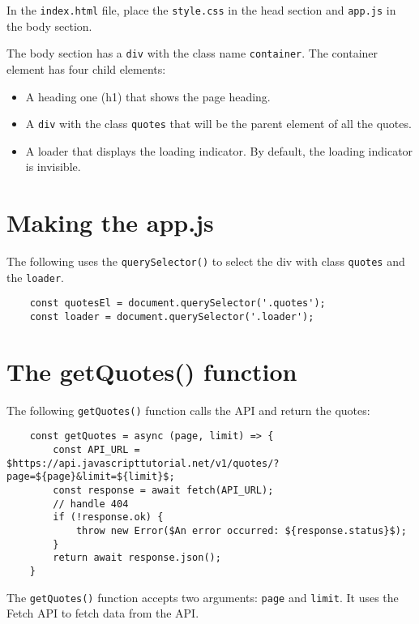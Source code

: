 \documentclass[11pt]{article}
\begin{document}
\noindent
In the \verb|index.html| file, place the \verb|style.css| in the head section
and \verb|app.js| in the body section.
\newline

\noindent
The body section has a \verb|div| with the class name \verb|container|.
The container element has four child elements:

\begin{itemize}
\item A heading one (h1) that shows the page heading.
\item A \verb|div| with the class \verb|quotes| that will be the parent element of
all the quotes.
\item A loader that displays the loading indicator. By default,
the loading indicator is invisible.
\end{itemize}

\section*{Making the app.js}

The following uses the \verb|querySelector()| to select the div with
class \verb|quotes| and the \verb|loader|.

\begin{lstlisting}
    const quotesEl = document.querySelector('.quotes');
    const loader = document.querySelector('.loader');
\end{lstlisting}

\section*{The getQuotes() function}

The following \verb|getQuotes()| function calls the API and return the quotes:

\begin{lstlisting}
    const getQuotes = async (page, limit) => {
        const API_URL = $https://api.javascripttutorial.net/v1/quotes/?page=${page}&limit=${limit}$;
        const response = await fetch(API_URL);
        // handle 404
        if (!response.ok) {
            throw new Error($An error occurred: ${response.status}$);
        }
        return await response.json();
    }
\end{lstlisting}

\noindent
The \verb|getQuotes()| function accepts two arguments: \verb|page| and \verb|limit|.
It uses the Fetch API to fetch data from the API.
\newline
\end{document}
